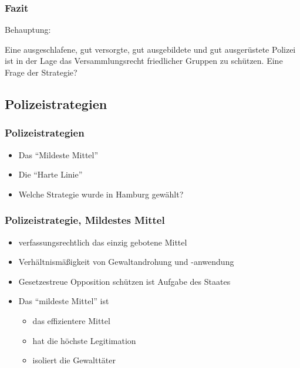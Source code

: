 \documentclass[]{beamer}
\begin{document}
	\begin{frame}
	\frametitle{Fazit}
	Behauptung:\par 
	Eine ausgeschlafene, gut versorgte, gut ausgebildete und gut ausgerüstete Polizei ist in der Lage das Versammlungsrecht friedlicher Gruppen zu schützen.
	\vfill
	Eine Frage der Strategie?
	\end{frame}


	\begin{frame}
	\subsection{Polizeistrategien}
	\frametitle{Polizeistrategien}
	\begin{itemize}
		\item Das \enquote{Mildeste Mittel}
		\item Die \enquote{Harte Linie}
		\item Welche Strategie wurde in Hamburg gewählt?
	\end{itemize}
	\end{frame}

	\begin{frame}
	\frametitle{Polizeistrategie, Mildestes Mittel}
	\begin{itemize}
		\item verfassungsrechtlich das einzig gebotene Mittel
		\item Verhältnismäßigkeit von Gewaltandrohung und -anwendung 
		\item Gesetzestreue Opposition schützen ist Aufgabe des Staates
		\item Das \enquote{mildeste Mittel} ist
		\begin{itemize}
			\item das effizientere Mittel
			\item hat die höchste Legitimation
			\item isoliert die Gewalttäter
		\end{itemize} 
	\end{itemize}
\end{frame}
\end{document}

